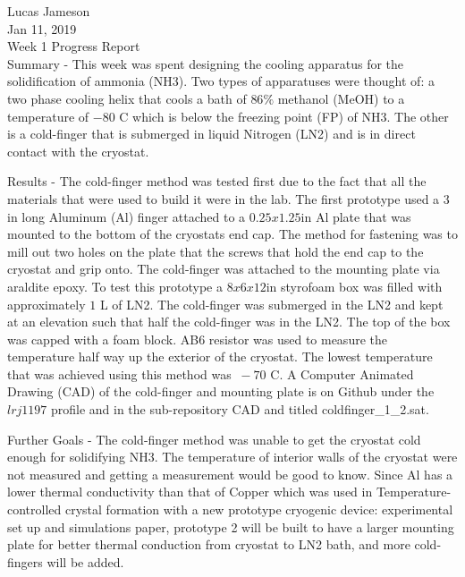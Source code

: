\documentclass[12pt]{article}
\begin{document}
\noindent Lucas Jameson\\
Jan 11, 2019 \\
Week 1 Progress Report \\

Summary - This week was spent designing the cooling apparatus for the solidification of ammonia (NH3). Two types of apparatuses were thought of: a two phase cooling helix that cools a bath of $86\%$ methanol (MeOH) to a temperature of $-80$ C which is below the freezing point (FP) of NH3. The other is a cold-finger that is submerged in liquid Nitrogen (LN2) and is in direct contact with the cryostat.

Results - The cold-finger method was tested first due to the fact that all the materials that were used to build it were in the lab. The first prototype used a $3$ in long Aluminum (Al) finger attached to a $0.25x1.25$in Al plate that was mounted to the bottom of the cryostats end cap. The method for fastening was to mill out two holes on the plate that the screws that hold the end cap to the cryostat and grip onto. The cold-finger was attached to the mounting plate via araldite epoxy. To test this prototype a $8x6x12$in styrofoam box was filled with approximately $1$ L of LN2. The cold-finger was submerged in the LN2 and kept at an elevation such that half the cold-finger was in the LN2. The top of the box was capped with a foam block. AB6 resistor was used to measure the temperature half way up the exterior of the cryostat. The lowest temperature that was achieved using this method was $~ -70$ C. A Computer Animated Drawing (CAD) of the cold-finger and mounting plate is on Github under the $lrj1197$ profile and in the sub-repository CAD and titled coldfinger_1_2.sat.

Further Goals - The cold-finger method was unable to get the cryostat cold enough for solidifying NH3. The temperature of interior walls of the cryostat were not measured and getting a measurement would be good to know. Since Al has a lower thermal conductivity than that of Copper which was used in Temperature-controlled crystal formation with a new prototype cryogenic device: experimental set up and simulations paper, prototype 2 will be built to have a larger mounting plate for better thermal conduction from cryostat to LN2 bath, and more cold-fingers will be added. 
\end{document}
